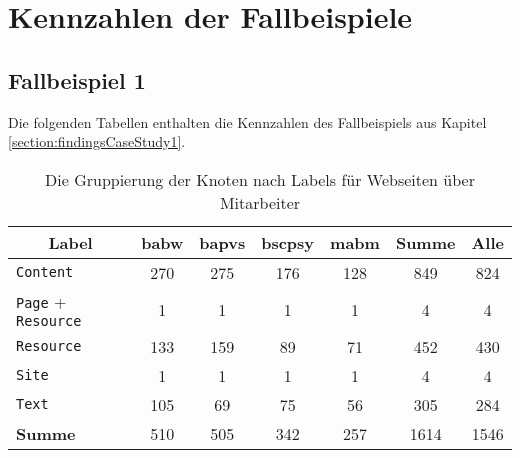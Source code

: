 \chapter{Kennzahlen der Fallbeispiele}
    \section{Fallbeispiel 1}
        \label{section:appendixExample1Figures}
        Die folgenden Tabellen enthalten die Kennzahlen des
        Fallbeispiels aus Kapitel \ref{section:findingsCaseStudy1}.

        \begin{table}[!h]
            \centering
            \begin{tabular}{|l|c|c|c|c|c|c|}
                \hline
                \multicolumn{1}{|c|}{\textbf{Label}} & \textbf{\gls{babw}} & \textbf{\gls{bapvs}} & \textbf{\gls{bscpsy}} & \textbf{\gls{mabm}} & \textbf{Summe} & \textbf{Alle} \\ \hline
                \texttt{Content}                                     & 270           & 275            & 176             & 128           & 849            & 824           \\ \hline
                \texttt{Page} + \texttt{Resource}                             & 1             & 1              & 1               & 1             & 4              & 4             \\ \hline
                \texttt{Resource}                                    & 133           & 159            & 89              & 71            & 452            & 430           \\ \hline
                \texttt{Site}                                        & 1             & 1              & 1               & 1             & 4              & 4             \\ \hline
                \texttt{Text}                                        & 105           & 69             & 75              & 56            & 305            & 284           \\ \hline
                \hline
                \textbf{Summe}                              & 510           & 505            & 342             & 257           & 1614           & 1546          \\ \hline
            \end{tabular}
            \caption{Die Gruppierung der Knoten nach Labels für Webseiten über Mitarbeiter}
            \label{table:findingsTeachersFiguresNodesByLabel}
        \end{table}

